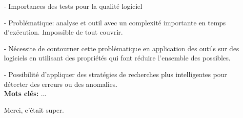 \documentclass[
12pt, %
french, %
singlespacing, %
headsepline, %
]{MastersDoctoralThesis} %
\begin{document}





\newenvironment{abstract}%
{\cleardoublepage\thispagestyle{empty}\null\vfill\begin{center}%
\bfseries\abstractname\end{center}}%
{\vfill\null}

\begin{abstract}

- Importances des tests pour la qualité logiciel

- Problématique: analyse et outil avec un complexité importante en temps d'exécution. Impossible de tout couvrir.

- Nécessite de contourner cette problématique en application des outils sur des logiciels en utilisant des propriétés qui font réduire l'ensemble des possibles.

- Possibilité d'appliquer des stratégies de recherches plus intelligentes pour détecter des erreurs ou des anomalies.\\

\textbf{Mots clés:} \keywordnames
...


\end{abstract}

\ohead*{} %
\ofoot*{\pagemark} %
\begin{acknowledgements}
Merci, c'était super.
\end{acknowledgements}
\end{document}
